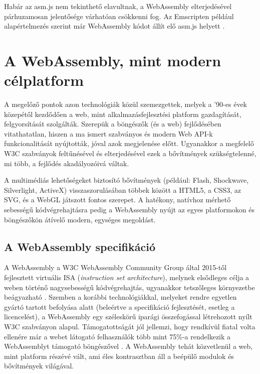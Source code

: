 Habár az asm.js nem tekinthető elavultnak, a WebAssembly elterjedésével párhuzamosan jelentősége várhatóan csökkenni fog. Az Emscripten például alapértelmezés szerint már WebAssembly kódot állít elő asm.js helyett \cite{GitHub::EmitWebAssemblyByDefaultInsteadOfAsmJs}.

\section{A WebAssembly, mint modern célplatform}

A megelőző pontok azon technológiák közül szemezgettek, melyek a '90-es évek közepétől kezdődően a web, mint alkalmazásfejlesztési platform gazdagítását, felgyorsítását szolgálták. Szerepük a böngészők (és a web) fejlődésében vitathatatlan, hiszen a ma ismert szabványos és modern Web API-k funkcionalitását nyújtották, jóval azok megjelenése előtt. Ugyanakkor a megfelelő W3C szabványok feltűnésével és elterjedésével ezek a bővítmények szükségtelenné, mi több, a fejlődés akadályozóivá váltak.

A multimédiás lehetőségeket biztosító bővítmények (például: Flash, Shockwave, Silverlight, ActiveX) visszaszorulásában többek között a HTML5, a CSS3, az SVG, és a WebGL játszott fontos szerepet. A hatékony, natívhoz mérhető sebességű kódvégrehajtásra pedig a WebAssembly nyújt az egyes platformokon és böngészőkön átívelő modern, egységes megoldást.

\subsection{A WebAssembly specifikáció}

A WebAssembly a W3C WebAssembly Community Group által 2015-től fejlesztett virtuális ISA (\textit{instruction set architecture}), melynek elsődleges célja a weben történő nagysebességű kódvégrehajtás, ugyanakkor tetszőleges környezetbe beágyazható \cite{WebAssemblySpecification}. Szemben a korábbi technológiákkal, melyeket rendre egyetlen gyártó tartott befolyása alatt (beleértve a specifikáció fejlesztését, esetleg a licencelést), a WebAssembly egy széleskörű iparági összefogással létrehozott nyílt W3C szabványon alapul. Támogatottságát jól jellemzi, hogy rendkívül fiatal volta ellenére már a webet látogató felhasználók több mint 75\%-a rendelkezik a WebAssemblyt támogató böngészővel \cite{CanIUseWebAssembly}. A WebAssembly tehát közvetlenül a web, mint platform részévé vált, ami éles kontrasztban áll a beépülő modulok és bővítmények világával.


